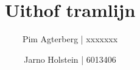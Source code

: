 \documentclass[a4paper]{article}
\title{Uithof tramlijn}
\author{Pim Agterberg | xxxxxxx \and{Jarno Holstein | 6013406}}
\begin{document}
\maketitle
\pagebreak

\tableofcontents
\pagebreak


\pagebreak

\pagebreak

\pagebreak

\pagebreak

\pagebreak

\pagebreak

\pagebreak

\pagebreak

\end{document}
